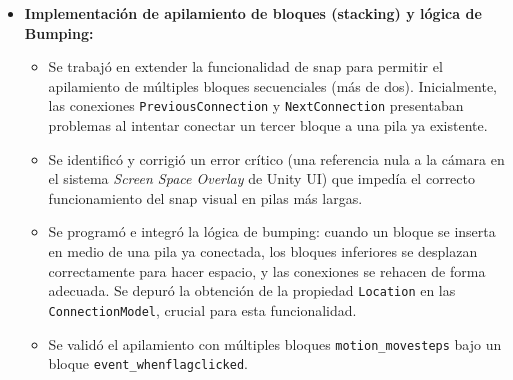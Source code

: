 \begin{itemize}
\begin{itemize}
\begin{itemize}
		\end{itemize}
		\item \textbf{Implementación de apilamiento de bloques (stacking) y lógica de Bumping:}
		\begin{itemize}
			\item Se trabajó en extender la funcionalidad de snap para permitir el apilamiento de múltiples bloques secuenciales (más de dos). Inicialmente, las conexiones \texttt{PreviousConnection} y \texttt{NextConnection} presentaban problemas al intentar conectar un tercer bloque a una pila ya existente.
			\item Se identificó y corrigió un error crítico (una referencia nula a la cámara en el sistema \textit{Screen Space Overlay} de Unity UI) que impedía el correcto funcionamiento del snap visual en pilas más largas.
			\item Se programó e integró la lógica de bumping: cuando un bloque se inserta en medio de una pila ya conectada, los bloques inferiores se desplazan correctamente para hacer espacio, y las conexiones se rehacen de forma adecuada. Se depuró la obtención de la propiedad \texttt{Location} en las \texttt{ConnectionModel}, crucial para esta funcionalidad.
			\item Se validó el apilamiento con múltiples bloques \texttt{motion\_movesteps} bajo un bloque \texttt{event\_whenflagclicked}.
		\end{itemize}
		

\end{itemize}
\end{itemize}
